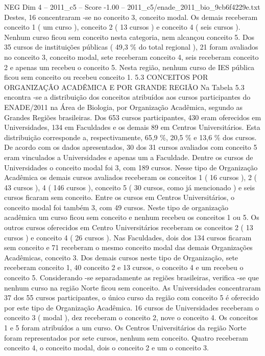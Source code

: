 \begin{textsample}{NEG Dim 4 – 2011\_c5 – Score -1.00 – 2011\_c5/enade\_2011\_bio\_9cb6f4229e.txt}
Destes, 16 concentraram -se no conceito 3, conceito modal.
Os demais receberam conceito 1 ( um curso ), conceito 2 ( 13 cursos ) e conceito 4 ( seis cursos ).
Nenhum curso ficou sem conceito nesta categoria, nem alcançou conceito 5.
Dos 35 cursos de instituições públicas ( 49,3 \% do total regional ), 21 foram avaliados no conceito 3, conceito modal, sete receberam conceito 4, seis receberam conceito 2 e apenas um recebeu o conceito 5.
Nesta região, nenhum curso de IES pública ficou sem conceito ou recebeu conceito 1. 5.3 CONCEITOS POR ORGANIZAÇÃO ACADÊMICA E POR GRANDE REGIÃO Na Tabela 5.3 encontra -se a distribuição dos conceitos atribuídos aos cursos participantes do ENADE/2011 na Área de Biologia, por Organização Acadêmica, segundo as Grandes Regiões brasileiras.
Dos 653 cursos participantes, 430 eram oferecidos em Universidades, 134 em Faculdades e os demais 89 em Centros Universitários.
Esta distribuição corresponde a, respectivamente, 65,9 \%, 20,5 \% e 13,6 \% dos cursos.
De acordo com os dados apresentados, 30 dos 31 cursos avaliados com conceito 5 eram vinculados a Universidades e apenas um a Faculdade.
Dentre os cursos de Universidades o conceito modal foi 3, com 189 cursos.
Nesse tipo de Organização Acadêmica os demais cursos avaliados receberam os conceitos 1 ( 16 cursos ), 2 ( 43 cursos ), 4 ( 146 cursos ), conceito 5 ( 30 cursos, como já mencionado ) e seis cursos ficaram sem conceito.
Entre os cursos em Centros Universitários, o conceito modal foi também 3, com 49 cursos.
Neste tipo de organização acadêmica um curso ficou sem conceito e nenhum recebeu os conceitos 1 ou 5.
Os outros cursos oferecidos em Centro Universitários receberam os conceitos 2 ( 13 cursos ) e conceito 4 ( 26 cursos ).
Nas Faculdades, dois dos 134 cursos ficaram sem conceito e 71 receberam o mesmo conceito modal das demais Organizações Acadêmicas, conceito 3.
Dos demais cursos neste tipo de Organização, sete receberam conceito 1, 40 conceito 2 e 13 cursos, o conceito 4 e um recebeu o conceito 5.
Considerando -se separadamente as regiões brasileiras, verifica -se que nenhum curso na região Norte ficou sem conceito.
As Universidades concentraram 37 dos 55 cursos participantes, o único curso da região com conceito 5 é oferecido por este tipo de Organização Acadêmica. 16 cursos de Universidades receberam o conceito 3 ( modal ), dez receberam o conceito 2, nove o conceito 4.
Os conceitos 1 e 5 foram atribuídos a um curso.
Os Centros Universitários da região Norte foram representados por sete cursos, nenhum sem conceito.
Quatro receberam conceito 4, o conceito modal, dois o conceito 2 e um o conceito 3.

\end{textsample}
